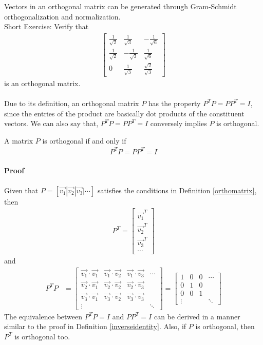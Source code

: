 Vectors in an orthogonal matrix can be generated through Gram-Schmidt orthogonalization and normalization.\\
Short Exercise: Verify that 
\begin{align*}
\begin{bmatrix}
\frac{1}{\sqrt{2}} & \frac{1}{\sqrt{3}} & -\frac{1}{\sqrt{6}} \\
\frac{1}{\sqrt{2}} & -\frac{1}{\sqrt{3}} & \frac{1}{\sqrt{6}} \\
0 & \frac{1}{\sqrt{3}} & \frac{\sqrt{2}}{\sqrt{3}}
\end{bmatrix}
\end{align*}
is an orthogonal matrix.\\
\\
Due to its definition, an orthogonal matrix $P$ has the property $P^TP = PP^T = I$, since the entries of the product are basically dot products of the constituent vectors. We can also say that, $P^TP = PP^T = I$ conversely implies $P$ is orthogonal.
\begin{proper}
\label{orthomatprop}
A matrix $P$ is orthogonal if and only if
\begin{align*}
P^TP = PP^T = I
\end{align*}
\paragraph{Proof} Given that $P = [\vec{v_1}|\vec{v_2}|\vec{v_3}|\cdots]$ satisfies the conditions in Definition \ref{orthomatrix}, then
\begin{align*}
P^T =
\left[
\begin{array}{c}
\vec{v_1}^T \\
\hline
\vec{v_2}^T \\
\hline
\vec{v_3}^T \\
\hline
\cdots
\end{array}
\right]
\end{align*}
and
\begin{align*}
P^T P &=
\begin{bmatrix}
\vec{v_1} \cdot \vec{v_1} & \vec{v_1} \cdot \vec{v_2} & \vec{v_1} \cdot \vec{v_3} & \cdots \\ 
\vec{v_2} \cdot \vec{v_1} & \vec{v_2} \cdot \vec{v_2} & \vec{v_2} \cdot \vec{v_3} & \\ 
\vec{v_3} \cdot \vec{v_1} & \vec{v_3} \cdot \vec{v_2} & \vec{v_3} \cdot \vec{v_3} & \\ 
\vdots & & & \ddots
\end{bmatrix} =
\begin{bmatrix}
1 & 0 & 0 & \cdots \\ 
0 & 1 & 0 & \\ 
0 & 0 & 1 & \\ 
\vdots & & & \ddots
\end{bmatrix}
\end{align*}
The equivalence between $P^TP = I$ and $PP^T = I$ can be derived in a manner similar to the proof in Definition \ref{inverseidentity}. Also, if $P$ is orthogonal, then $P^T$ is orthogonal too.
\end{proper}
